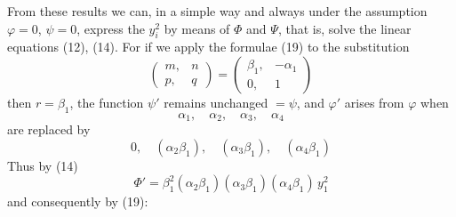 From these results we can, in a simple way and always under the
assumption $\varphi = 0$, $\psi = 0$, express the $y_i^2$ by means of $\Phi$ and
$\Psi$, that is, solve the linear equations (12), (14).
For if we apply the formulae (19) to the substitution
\[
\begin{pmatrix} m, & n\\ p, & q \end{pmatrix} = \begin{pmatrix} \beta_1, & -\alpha_1\\ 0, & 1 \end{pmatrix}
\]
then $r = \beta_1$, the function $\psi'$ remains
unchanged $= \psi$, and $\varphi'$ arises from $\varphi$ when
\[
\alpha_1,\quad \alpha_2,\quad \alpha_3,\quad \alpha_4
\]
are replaced by
\[
0,\quad (\alpha_2\beta_1),\quad (\alpha_3\beta_1),\quad (\alpha_4\beta_1)
\]
Thus by (14)
\[
\Phi' = \beta_1^2(\alpha_2\beta_1)(\alpha_3\beta_1)(\alpha_4\beta_1)\,y_1^2
\]
and consequently by (19):

